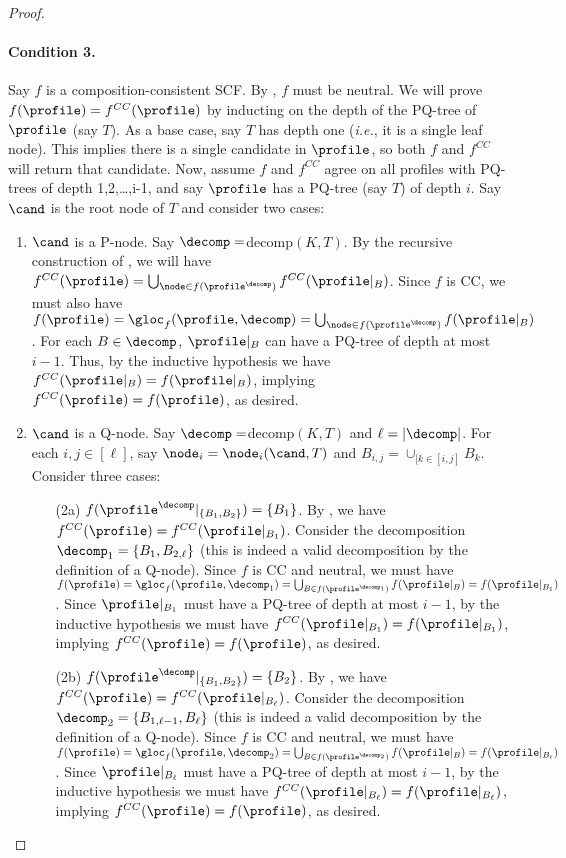 \begin{proof}
\paragraph{Condition 3.} Say $f$ is a composition-consistent SCF. By , $f$ must be neutral. We will prove $f(\profile)=f^{CC}(\profile)$ by inducting on the depth of the PQ-tree of $\profile$ (say $T$). As a base case, say $T$ has depth one (\emph{i.e.}, it is a single leaf node). This implies there is a single candidate in $\profile$, so both $f$ and $f^{CC}$ will return that candidate. Now, assume $f$ and $f^{CC}$ agree on all profiles with PQ-trees of depth 1,2,\ldots,i-1, and say $\profile$ has a PQ-tree (say $T$) of depth $i$. Say $\cand$ is the root node of $T$ and consider two cases:
\begin{enumerate}
    \item $\cand$ is a P-node. Say $\decomp =$decomp$(K,T)$. By the recursive construction of , we will have $f^{CC}(\profile)= \bigcup_{\node \in f(\profile^\decomp)}f^{CC}(\profile|_B)$. Since $f$ is CC, we must also have $f(\profile)=\gloc_{f}(\profile,\decomp)= \bigcup_{\node \in f(\profile^\decomp)}f(\profile|_B)$. For each $B \in \decomp$, $\profile|_B$ can have a PQ-tree of depth at most $i-1$. Thus, by the inductive hypothesis we have $f^{CC}(\profile|_B)=f(\profile|_B)$, implying $f^{CC}(\profile)=f(\profile)$, as desired.
    \item $\cand$ is a Q-node. Say $\decomp =$decomp$(K,T)$ and $\ell =|\decomp|$. For each $i,j \in [\ell]$, say $\node_{i} = \node_i(\cand, T)$ and $B_{i,j}= \cup_{[k\in [i,j]}B_k$. Consider three cases:
    \begin{enumerate}
        \item[(2a)] $f(\profile^\decomp|_{\{B_1,B_2\}})=\{B_1\}$. By , we have $f^{CC}(\profile)=f^{CC}(\profile|_{B_1})$. Consider the decomposition $\decomp_1 = \{B_1, B_{2,\ell}\}$ (this is indeed a valid decomposition by the definition of a Q-node). Since $f$ is CC and neutral, we must have $f(\profile)=\gloc_f(\profile,\decomp_1)=\bigcup_{B \in f(\profile^{\decomp_1})}f(\profile|_B)=f(\profile|_{B_1})$. Since $\profile|_{B_1}$ must have a PQ-tree of depth at most $i-1$, by the inductive hypothesis we must have $f^{CC}(\profile|_{B_1})= f(\profile|_{B_1})$, implying $f^{CC}(\profile)=f(\profile)$, as desired. 
        \item[(2b)] $f(\profile^\decomp|_{\{B_1,B_2\}})=\{B_2\}$. By , we have $f^{CC}(\profile)=f^{CC}(\profile|_{B_\ell})$. Consider the decomposition $\decomp_2 = \{B_{1,\ell-1}, B_{\ell}\}$ (this is indeed a valid decomposition by the definition of a Q-node). Since $f$ is CC and neutral, we must have $f(\profile)=\gloc_f(\profile,\decomp_2)=\bigcup_{B \in f(\profile^{\decomp_2})}f(\profile|_B)=f(\profile|_{B_\ell})$. Since $\profile|_{B_\ell}$ must have a PQ-tree of depth at most $i-1$, by the inductive hypothesis we must have $f^{CC}(\profile|_{B_\ell})= f(\profile|_{B_\ell})$, implying $f^{CC}(\profile)=f(\profile)$, as desired. 

\end{enumerate}
\end{enumerate}
\end{proof}
